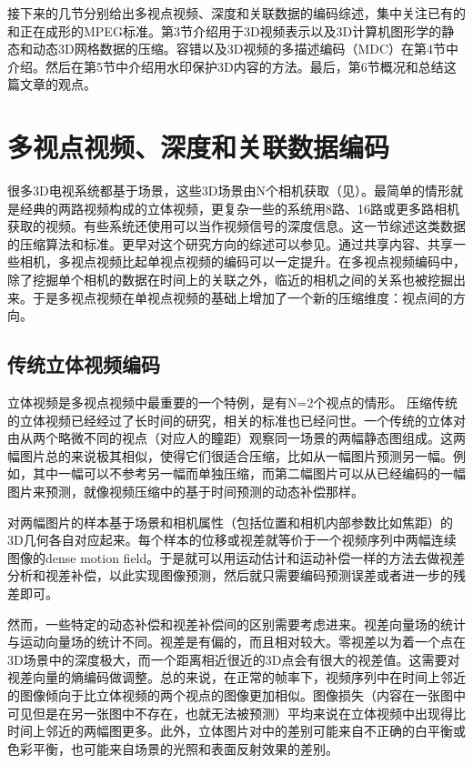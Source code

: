 接下来的几节分别给出多视点视频、深度和关联数据的编码综述，集中关注已有的和正在成形的MPEG标准。第3节介绍用于3D视频表示以及3D计算机图形学的静态和动态3D网格数据的压缩。容错以及3D视频的多描述编码（MDC）在第4节中介绍。然后在第5节中介绍用水印保护3D内容的方法。最后，第6节概况和总结这篇文章的观点。

\section{多视点视频、深度和关联数据编码}

很多3D电视系统都基于场景，这些3D场景由N个相机获取（见）。最简单的情形就是经典的两路视频构成的立体视频，更复杂一些的系统用8路、16路或更多路相机获取的视频。有些系统还使用可以当作视频信号的深度信息。这一节综述这类数据的压缩算法和标准。更早对这个研究方向的综述可以参见。通过共享内容、共享一些相机，多视点视频比起单视点视频的编码可以一定提升。在多视点视频编码中，除了挖掘单个相机的数据在时间上的关联之外，临近的相机之间的关系也被挖掘出来。于是多视点视频在单视点视频的基础上增加了一个新的压缩维度：视点间的方向。

\subsection{传统立体视频编码}

立体视频是多视点视频中最重要的一个特例，是有N=2个视点的情形。 压缩传统的立体视频已经经过了长时间的研究，相关的标准也已经问世。一个传统的立体对由从两个略微不同的视点（对应人的瞳距）观察同一场景的两幅静态图组成。这两幅图片总的来说极其相似，使得它们很适合压缩，比如从一幅图片预测另一幅。例如，其中一幅可以不参考另一幅而单独压缩，而第二幅图片可以从已经编码的一幅图片来预测，就像视频压缩中的基于时间预测的动态补偿那样。
 
对两幅图片的样本基于场景和相机属性（包括位置和相机内部参数比如焦距）的3D几何各自对应起来。每个样本的位移或视差就等价于一个视频序列中两幅连续图像的dense motion field。于是就可以用运动估计和运动补偿一样的方法去做视差分析和视差补偿，以此实现图像预测，然后就只需要编码预测误差或者进一步的残差即可。

然而，一些特定的动态补偿和视差补偿间的区别需要考虑进来。视差向量场的统计与运动向量场的统计不同。视差是有偏的，而且相对较大。零视差以为着一个点在 3D场景中的深度极大，而一个距离相近很近的3D点会有很大的视差值。这需要对视差向量的熵编码做调整。总的来说，在正常的帧率下，视频序列中在时间上邻近的图像倾向于比立体视频的两个视点的图像更加相似。图像损失（内容在一张图中可见但是在另一张图中不存在，也就无法被预测）平均来说在立体视频中出现得比时间上邻近的两幅图更多。此外，立体图片对中的差别可能来自不正确的白平衡或色彩平衡，也可能来自场景的光照和表面反射效果的差别。 

